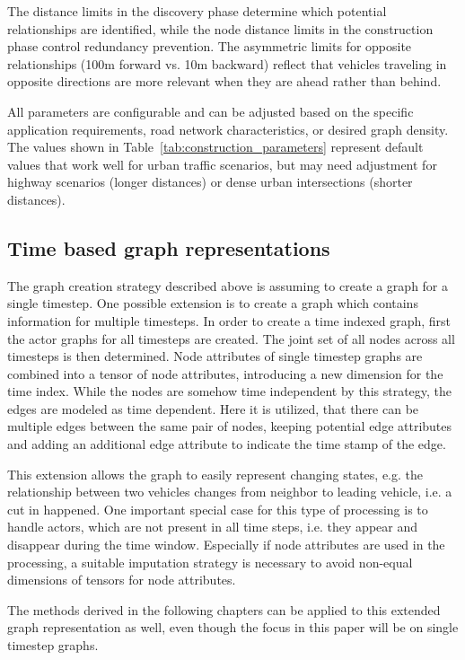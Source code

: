 The distance limits in the discovery phase determine which potential relationships are identified, 
while the node distance limits in the construction phase control redundancy prevention. The 
asymmetric limits for opposite relationships (100m forward vs. 10m backward) reflect that vehicles 
traveling in opposite directions are more relevant when they are ahead rather than behind.

All parameters are configurable and can be adjusted based on the specific application 
requirements, road network characteristics, or desired graph density. The values shown in 
Table~\ref{tab:construction_parameters} represent default values that work well for urban traffic 
scenarios, but may need adjustment for highway scenarios (longer distances) or dense urban 
intersections (shorter distances).



\subsection{Time based graph representations}
The graph creation strategy described above is assuming to create a graph for a single timestep. 
One possible extension is to create a graph which contains information for multiple timesteps. In 
order to create a time indexed graph, first the actor graphs for all timesteps are created. The 
joint set of all nodes across all timesteps is then determined. Node attributes of single timestep 
graphs are combined into a tensor of node attributes, introducing a new dimension for the time 
index. While the nodes are somehow time independent by this strategy, the edges are modeled as 
time dependent. Here it is utilized, that there can be multiple edges between the same pair of 
nodes, keeping potential edge attributes and adding an additional edge attribute to indicate the 
time stamp of the edge.

This extension allows the graph to easily represent changing states, e.g. the relationship between 
two vehicles changes from neighbor to leading vehicle, i.e. a cut in happened. One important 
special case for this type of processing is to handle actors, which are not present in all time 
steps, i.e. they appear and disappear during the time window. Especially if node attributes are 
used in the processing, a suitable imputation strategy is necessary to avoid non-equal dimensions 
of tensors for node attributes.

The methods derived in the following chapters can be applied to this extended graph representation 
as well, even though the focus in this paper will be on single timestep graphs.
